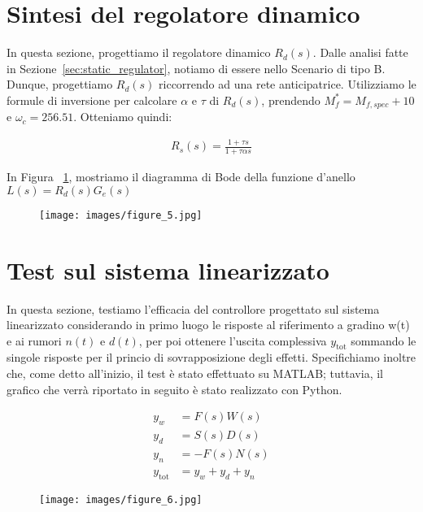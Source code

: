 \documentclass[a4paper, 11pt]{article}
\begin{document}
\section{Sintesi del regolatore dinamico}

In questa sezione, progettiamo il regolatore dinamico $R_d(s)$. 
%
Dalle analisi fatte in Sezione~\ref{sec:static_regulator}, notiamo di essere nello Scenario di tipo B. Dunque, progettiamo $R_d(s)$ riccorrendo ad una rete anticipatrice. Utilizziamo le formule di inversione per calcolare $\alpha$ e $\tau$ di $R_d(s)$, prendendo $M_f^*=M_{f,spec}+10$ e $\omega_c=256.51$. Otteniamo quindi:

\begin{align}\label{eq:R_s}
R_s(s)=\frac{1+\tau s}{1+\tau\alpha s}
\end{align}

In Figura ~\ref{Figura4}, mostriamo il diagramma di Bode della funzione d'anello $L(s) = R_d(s) G_e(s)$
\begin{figure}[H]
    \centering
\texttt{[image: images/figure\_5.jpg]}
    \caption{}
    \label{Figura4}
\end{figure}
\section{Test sul sistema linearizzato}

In questa sezione, testiamo l'efficacia del controllore progettato sul sistema linearizzato considerando in primo luogo le risposte al riferimento a gradino w(t) e ai rumori $n(t)$ e $d(t)$, per poi ottenere l'uscita complessiva $y_{\text{tot}}$ sommando le singole risposte per il princio di sovrapposizione degli effetti. Specifichiamo inoltre che, come detto all'inizio, il test è stato effettuato su MATLAB; tuttavia, il grafico che verrà riportato in seguito è stato realizzato con Python.

%
\begin{subequations}\label{eq:system}
\begin{align}
	    y_w &= F(s)W(s)
        \\
        y_d &= S(s)D(s)
        \\
        y_n &= -F(s)N(s)
        \\
        y_{\text{tot}}&= y_w+y_d+y_n
\end{align}
\end{subequations}
%
\begin{figure}[H]
    \centering
\texttt{[image: images/figure\_6.jpg]}
    \caption{}
    \label{Figura6}
\end{figure}
\end{document}
